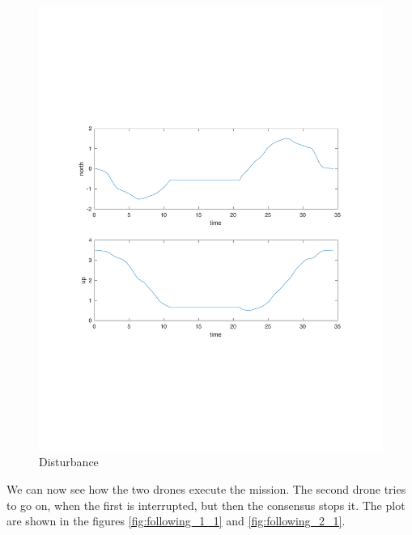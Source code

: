 \begin{figure}[h]
\centering
\includegraphics[width=1.0\textwidth]{chapters/chapter-04/figures/pos_1.pdf}
\caption{Disturbance}
\label{fig:disturbance}
\end{figure}

We can now see how the two drones execute the mission. The second drone tries to
go on, when the first is interrupted, but then the consensus stops it. The plot are
shown in the figures \ref{fig:following_1_1} and \ref{fig:following_2_1}.

